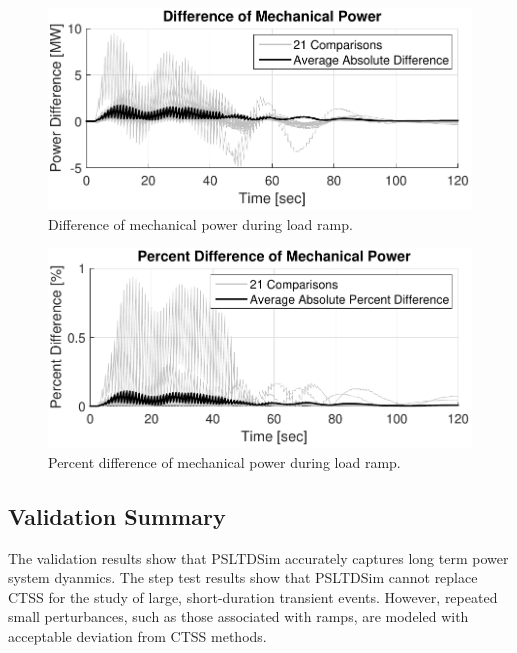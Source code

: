 \begin{figure}[!ht]
	\centering
	\includegraphics[width=\linewidth]{figures/miniWECC3ALTDrampPm2}
	\caption{Difference of mechanical power during load ramp.}
	\label{fig: rampPmdif}
\end{figure}

\begin{figure}[!ht]
	\centering
	\includegraphics[width=\linewidth]{figures/miniWECC3ALTDrampPm3}
	\caption{Percent difference of mechanical power during load ramp.}
	\label{fig: rampPmPercentdif}
\end{figure}
\subsection{Validation Summary}
The validation results show that PSLTDSim accurately captures long term power system dyanmics. 
The step test results show that PSLTDSim cannot replace CTSS for the study of large, short-duration transient events.
However, repeated small perturbances, such as those associated with ramps, are modeled with acceptable deviation from CTSS methods.